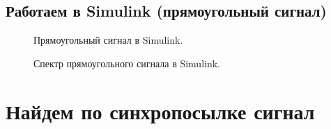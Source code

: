 \documentclass[12pt,a4paper]{scrartcl}
\begin{document}
\clearpage
\newpage
\subsection{Работаем в Simulink (прямоугольный сигнал)}
\label{sec:workSim2}


\begin{figure}[h!]
\caption{Прямоугольный сигнал в Simulink.}
\end{figure}

\begin{figure}[h!]
\caption{Спектр прямоугольного сигнала в Simulink.}
\end{figure}

\clearpage
\newpage

\section{Найдем по синхропосылке сигнал}
\label{sec:wlab2}
\end{document}
